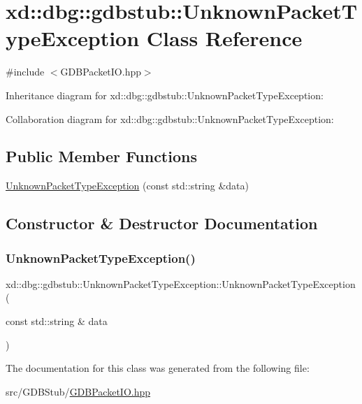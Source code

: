 \hypertarget{classxd_1_1dbg_1_1gdbstub_1_1_unknown_packet_type_exception}{}\section{xd\+:\+:dbg\+:\+:gdbstub\+:\+:Unknown\+Packet\+Type\+Exception Class Reference}
\label{classxd_1_1dbg_1_1gdbstub_1_1_unknown_packet_type_exception}


{\ttfamily \#include $<$G\+D\+B\+Packet\+I\+O.\+hpp$>$}



Inheritance diagram for xd\+:\+:dbg\+:\+:gdbstub\+:\+:Unknown\+Packet\+Type\+Exception\+:


Collaboration diagram for xd\+:\+:dbg\+:\+:gdbstub\+:\+:Unknown\+Packet\+Type\+Exception\+:
\subsection*{Public Member Functions}
\begin{DoxyCompactItemize}
\item 
\mbox{\hyperlink{classxd_1_1dbg_1_1gdbstub_1_1_unknown_packet_type_exception_adf22426d4db1c85bf548dd7e0935edd8}{Unknown\+Packet\+Type\+Exception}} (const std\+::string \&data)
\end{DoxyCompactItemize}


\subsection{Constructor \& Destructor Documentation}
\mbox{\label{classxd_1_1dbg_1_1gdbstub_1_1_unknown_packet_type_exception_adf22426d4db1c85bf548dd7e0935edd8}} 
\subsubsection{\texorpdfstring{Unknown\+Packet\+Type\+Exception()}{UnknownPacketTypeException()}}
{\footnotesize\ttfamily xd\+::dbg\+::gdbstub\+::\+Unknown\+Packet\+Type\+Exception\+::\+Unknown\+Packet\+Type\+Exception (\begin{DoxyParamCaption}\item[{const std\+::string \&}]{data }\end{DoxyParamCaption})\hspace{0.3cm}{\ttfamily [inline]}}



The documentation for this class was generated from the following file\+:\begin{DoxyCompactItemize}
\item 
src/\+G\+D\+B\+Stub/\mbox{\hyperlink{_g_d_b_packet_i_o_8hpp}{G\+D\+B\+Packet\+I\+O.\+hpp}}\end{DoxyCompactItemize}
